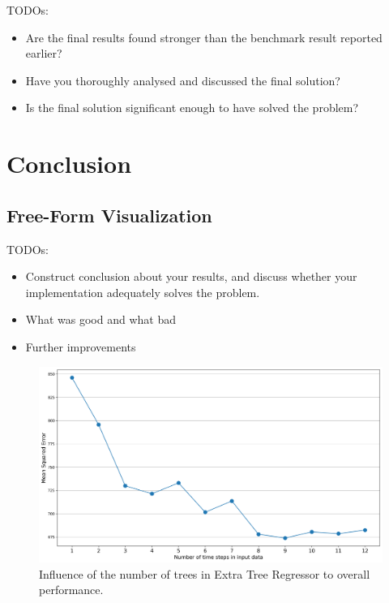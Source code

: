 \documentclass{article}
\begin{document}
\color{red}
TODOs:
\begin{itemize}
    \item Are the final results found stronger than the benchmark result reported earlier?
    \item Have you thoroughly analysed and discussed the final solution?
    \item Is the final solution significant enough to have solved the problem?
\end{itemize}
\color{black}

\section{Conclusion}

\subsection{Free-Form Visualization}
\color{red}
TODOs:
\begin{itemize}
    \item Construct conclusion about your results, and discuss whether your implementation adequately solves the problem.
    \item What was good and what bad
    \item Further improvements
\end{itemize}
\color{black}

\begin{figure}[h!]
\centering
\includegraphics[width=16cm]{imgs/ts_vs_mse.png}
\caption{Influence of the number of trees in Extra Tree Regressor to overall performance.}
\label{fig:influence_trees}
\end{figure}
\end{document}
